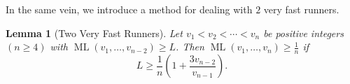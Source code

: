 \documentclass[11pt]{amsart}
\newtheorem{lemma}{Lemma}[section]
\newcommand{\norm}[1]{\lVert #1 \rVert}
\DeclareMathOperator{\ML}{ML}
\begin{document}
In the same vein, we introduce a method for dealing with $2$ very fast runners.

\begin{lemma}[Two Very Fast Runners]
\label{lem4}
    Let $v_1 < v_2 < \cdots < v_n$ be positive integers $(n \geq 4)$ with $\ML(v_1,\ldots,v_{n - 2}) \geq L$. Then $\ML(v_1,\ldots,v_n) \geq \frac{1}{n}$ if
    $$L \geq \frac{1}{n}\left(1 + \frac{3v_{n - 2}}{v_{n - 1}}\right).$$
\end{lemma}

\end{document}
